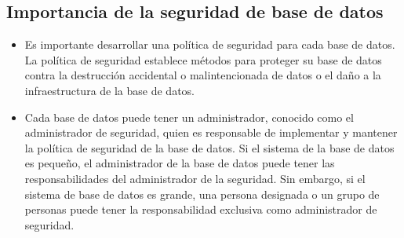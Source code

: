 \documentclass[%
 reprint,
 amsmath,amssymb,
 aps,
]{revtex4-1}
\begin{document}
\subsection{Importancia de la seguridad de base de datos}
\begin{itemize}
	\item Es importante desarrollar una política de seguridad para cada base de datos. La política de seguridad establece métodos para proteger su base de datos contra la destrucción accidental o malintencionada de datos o el daño a la infraestructura de la base de datos.
	\item Cada base de datos puede tener un administrador, conocido como el administrador de seguridad, quien es responsable de implementar y mantener la política de seguridad de la base de datos. Si el sistema de la base de datos es pequeño, el administrador de la base de datos puede tener las responsabilidades del administrador de la seguridad. Sin embargo, si el sistema de base de datos es grande, una persona designada o un grupo de personas puede tener la responsabilidad exclusiva como administrador de seguridad. \cite{oracle}
\end{itemize}
\end{document}
